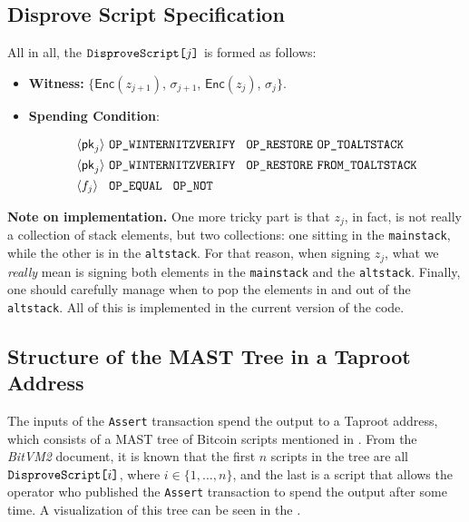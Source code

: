 \documentclass{iacrtrans}
\newcommand{\elem}[1]{\, \langle #1 \rangle \,}
\newcommand{\opcode}[1]{\, \texttt{#1} \,}
\begin{document}
\subsection{Disprove Script Specification}

All in all, the $\texttt{DisproveScript[\text{$j$}]}$ is formed as follows:
\begin{itemize}
  \item \textbf{Witness:} $\Big\{\mathsf{Enc}(z_{j+1})$,
    $\sigma_{j+1}$, $\mathsf{Enc}(z_{j})$, $\sigma_j\Big\}$.
  \item \textbf{Spending Condition}:
    \begin{empheqboxed}
      \begin{align*}
        &\elem{\mathsf{pk}_j} \opcode{\texttt{OP\_WINTERNITZVERIFY} }
        \opcode{\texttt{OP\_RESTORE}} \opcode{\texttt{OP\_TOALTSTACK}} \\
        &\elem{\mathsf{pk}_{j}} \opcode{\texttt{OP\_WINTERNITZVERIFY}
        } \opcode{\texttt{OP\_RESTORE}} \opcode{\texttt{FROM\_TOALTSTACK}} \\
        &\elem{f_j} \opcode{ \texttt{OP\_EQUAL} } \opcode{\texttt{OP\_NOT}}
      \end{align*}
    \end{empheqboxed}
\end{itemize}

\textbf{Note on implementation.} One more tricky part is that $z_j$, in fact, is
not really a collection of stack elements, but two collections: one sitting in
the \texttt{mainstack}, while the other is in the \texttt{altstack}. For that
reason, when signing $z_j$, what we \textit{really} mean is signing both
elements in the \texttt{mainstack} and the \texttt{altstack}. Finally, one
should carefully manage when to pop the elements in and out of the
\texttt{altstack}. All of this is implemented in the current version of the
code.

\subsection{Structure of the MAST Tree in a Taproot
Address}\label{sec:mast-tree-structure}

The inputs of the \texttt{Assert} transaction spend the output to a Taproot
address, which consists of a MAST tree of Bitcoin scripts mentioned in
. From the \textit{BitVM2} document, it is known
that the first \(n\)
scripts in the tree are all \(\texttt{DisproveScript[\text{$i$}]}\), where \(i
\in \{1,\dots, n\}\), and the last is a script that allows the operator who
published the \texttt{Assert} transaction to spend the output after some time. A
visualization of this tree can be seen in the .
\end{document}
